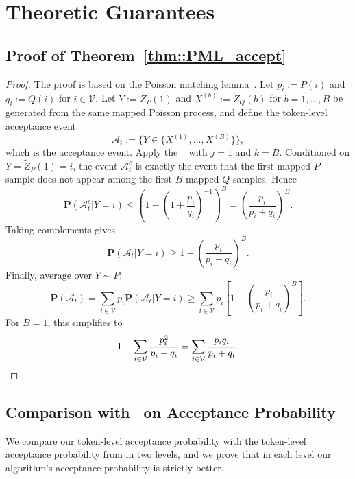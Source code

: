 \documentclass{article}
\theoremstyle{plain}
\theoremstyle{definition}
\begin{document}
\section{Theoretic Guarantees}
\label{app::theory}


\subsection{Proof of Theorem~\ref{thm::PML_accept}}
\label{subapp::proof_PML_accept}

\begin{proof}
The proof is based on the Poisson matching lemma~\citep{li2021unified}. 
Let $p_i := P(i)$ and $q_i := Q(i)$ for $i\in\mathcal{V}$. 
Let $Y := \tilde Z_P(1)$ and $X^{(b)} := \tilde Z_Q(b)$ for $b=1,\ldots,B$ be generated from the same mapped Poisson process, and define the token-level acceptance event
\[
\mathcal{A}_t := \Big\{Y \in \{X^{(1)},\ldots,X^{(B)}\}\Big\}, 
\]
which is the acceptance event. Apply the ~\citep[Lemma 3]{li2021unified} with $j=1$ and $k=B$.
Conditioned on $Y=\tilde Z_P(1)=i$, the event $\mathcal{A}_t^c$ is exactly the event that
the first mapped $P$-sample does not appear among the first $B$ mapped $Q$-samples.
Hence
\[
\mathbf{P}(\mathcal{A}_t^c  | Y=i)
\le
\left(1-\left(1+\frac{p_i}{q_i}\right)^{-1}\right)^B
=
\left(\frac{p_i}{p_i+q_i}\right)^B.
\]
Taking complements gives
\[
\mathbf{P}(\mathcal{A}_t  | Y=i)
\ge
1-\left(\frac{p_i}{p_i+q_i}\right)^B.
\]
Finally, average over $Y\sim P$:
\[
\mathbf{P}(\mathcal{A}_t)
=
\sum_{i\in\mathcal{V}} p_i \mathbf{P}(\mathcal{A}_t  | Y=i)
\ge
\sum_{i\in\mathcal{V}}
p_i\left[1-\left(\frac{p_i}{p_i+q_i}\right)^B\right].
\]
For $B=1$, this simplifies to
\[
1-\sum_{i\in\mathcal{V}}\frac{p_i^2}{p_i+q_i}
=
\sum_{i\in\mathcal{V}}\frac{p_iq_i}{p_i+q_i}.
\qedhere
\]
\end{proof}





\subsection{Comparison with~\citep{rowan2025list} on Acceptance Probability}
\label{subapp::compare_Rowan_acpt_prob}


We compare our token-level acceptance probability with the token-level acceptance probability from \citep{rowan2025list} in two levels, and we prove that in each level our algorithm's acceptance probability is strictly better. 
\end{document}
